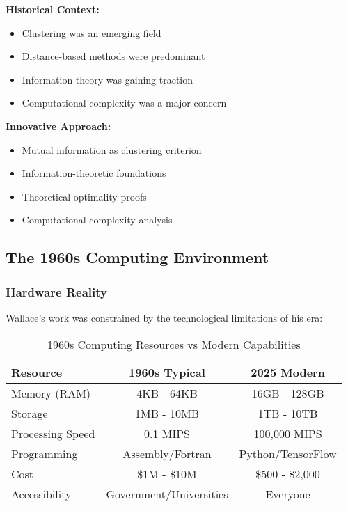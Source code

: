 \textbf{Historical Context:}
\begin{itemize}
    \item Clustering was an emerging field
    \item Distance-based methods were predominant
    \item Information theory was gaining traction
    \item Computational complexity was a major concern
\end{itemize}

\textbf{Innovative Approach:}
\begin{itemize}
    \item Mutual information as clustering criterion
    \item Information-theoretic foundations
    \item Theoretical optimality proofs
    \item Computational complexity analysis
\end{itemize}

\subsection{The 1960s Computing Environment}

\subsubsection{Hardware Reality}

Wallace's work was constrained by the technological limitations of his era:

\begin{table}[h!]
\centering
\caption{1960s Computing Resources vs Modern Capabilities}
\begin{tabular}{@{}lcc@{}}
\toprule
Resource & 1960s Typical & 2025 Modern \\
\midrule
Memory (RAM) & 4KB - 64KB & 16GB - 128GB \\
Storage & 1MB - 10MB & 1TB - 10TB \\
Processing Speed & 0.1 MIPS & 100,000 MIPS \\
Programming & Assembly/Fortran & Python/TensorFlow \\
Cost & \$1M - \$10M & \$500 - \$2,000 \\
Accessibility & Government/Universities & Everyone \\
\midrule
\end{tabular}
\end{table}

